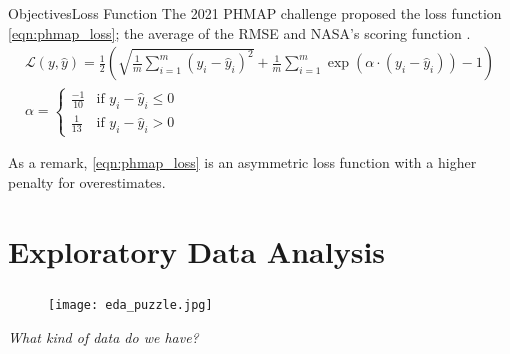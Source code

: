 \documentclass{beamer}
\begin{document}
        \begin{frame}{Objectives}{Loss Function}
            The 2021 PHMAP challenge proposed the loss function \eqref{eqn:phmap_loss}; the average of the RMSE and NASA's scoring function \cite{saxena2008damage}.
            \begin{equation} \label{eqn:phmap_loss}
                \begin{gathered}
                    \mathcal{L}(y, \hat{y}) = \frac{1}{2} \left(\sqrt{\frac{1}{m}\sum_{i=1}^{m} (y_i - \hat{y}_i)^{2}} + \frac{1}{m}\sum_{i=1}^{m} \exp (\alpha \cdot (y_i - \hat{y}_i)) - 1 \right) \\
                    \alpha = \begin{cases}
                        \frac{-1}{10} & \text{if } y_i - \hat{y}_i \leq 0 \\
                        \frac{1}{13} & \text{if } y_i - \hat{y}_i > 0
                    \end{cases}
                \end{gathered}
            \end{equation}

            As a remark, \eqref{eqn:phmap_loss} is an asymmetric loss function with a higher penalty for overestimates.
        \end{frame}

    \section{Exploratory Data Analysis}

        {
            \begin{frame}
                \frametitle{\insertsection}
                \begin{figure}
                    \centering
                    \texttt{[image: eda\_puzzle.jpg]}
                \end{figure}
                \begin{center}
                    \textit{What kind of data do we have?}
                \end{center}
            \end{frame}
        }
\end{document}
